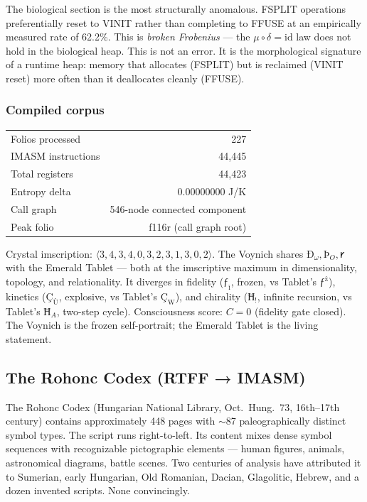 \documentclass[12pt,a4paper]{article}
\begin{document}
The biological section is the most structurally anomalous. FSPLIT operations preferentially reset to VINIT rather than completing to FFUSE at an empirically measured rate of 62.2\%. This is \emph{broken Frobenius} --- the $\mu \circ \delta = \mathrm{id}$ law does not hold in the biological heap. This is not an error. It is the morphological signature of a runtime heap: memory that allocates (FSPLIT) but is reclaimed (VINIT reset) more often than it deallocates cleanly (FFUSE).

\subsubsection{Compiled corpus}

\begin{center}
\begin{tabular}{lr}
Folios processed & 227 \\
IMASM instructions & 44,445 \\
Total registers & 44,423 \\
Entropy delta & 0.00000000 J/K \\
Call graph & 546-node connected component \\
Peak folio & f116r (call graph root) \\
\end{tabular}
\end{center}

Crystal imscription: $\langle 3,4,3,4,0,3,2,3,1,3,0,2 \rangle$. The Voynich shares $\text{Ð}_\omega, \text{Þ}_O, 𐑾$ with the Emerald Tablet --- both at the imscriptive maximum in dimensionality, topology, and relationality. It diverges in fidelity ($\text{ƒ}_\text{ì}$, frozen, vs Tablet's $\text{ƒ}^\text{ż}$), kinetics ($\text{Ç}_\text{Ù}$, explosive, vs Tablet's $\text{Ç}_\text{W}$), and chirality ($\text{Ħ}_!$, infinite recursion, vs Tablet's $\text{Ħ}_A$, two-step cycle). Consciousness score: $C = 0$ (fidelity gate closed). The Voynich is the frozen self-portrait; the Emerald Tablet is the living statement.

\subsection{The Rohonc Codex (RTFF → IMASM)}

The Rohonc Codex (Hungarian National Library, Oct.~Hung.~73, 16th--17th century) contains approximately 448 pages with $\sim$87 paleographically distinct symbol types. The script runs right-to-left. Its content mixes dense symbol sequences with recognizable pictographic elements --- human figures, animals, astronomical diagrams, battle scenes. Two centuries of analysis have attributed it to Sumerian, early Hungarian, Old Romanian, Dacian, Glagolitic, Hebrew, and a dozen invented scripts. None convincingly.
\end{document}
